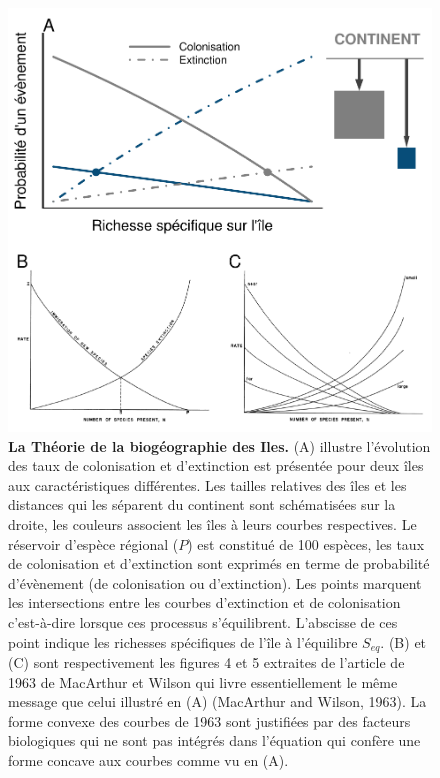 \begin{figure}[htbp]
\centering
\includegraphics{fig/fig1.pdf}
\caption{\textbf{La Théorie de la biogéographie des Iles.} (A) illustre
l'évolution des taux de colonisation et d'extinction est présentée pour
deux îles aux caractéristiques différentes. Les tailles relatives des
îles et les distances qui les séparent du continent sont schématisées
sur la droite, les couleurs associent les îles à leurs courbes
respectives. Le réservoir d'espèce régional (\(P\)) est constitué de 100
espèces, les taux de colonisation et d'extinction sont exprimés en terme
de probabilité d'évènement (de colonisation ou d'extinction). Les points
marquent les intersections entre les courbes d'extinction et de
colonisation c'est-à-dire lorsque ces processus s'équilibrent.
L'abscisse de ces point indique les richesses spécifiques de l'île à
l'équilibre \(S_{eq}\). (B) et (C) sont respectivement les figures 4 et
5 extraites de l'article de 1963 de MacArthur et Wilson qui livre
essentiellement le même message que celui illustré en (A) (MacArthur and
Wilson, 1963). La forme convexe des courbes de 1963 sont justifiées par
des facteurs biologiques qui ne sont pas intégrés dans l'équation
\label{eqMW} qui confère une forme concave aux courbes comme vu en
(A).\label{fig:figMW}}
\end{figure}

